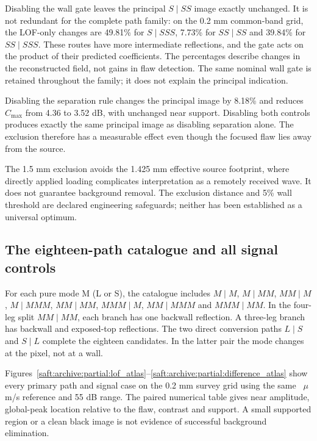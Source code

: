 \documentclass[11pt]{article}
\begin{document}
Disabling the wall gate leaves the principal $S\mid SS$ image exactly unchanged. It is not redundant for the complete path family: on the 0.2 mm common-band grid, the LOF-only changes are 49.81\% for $S\mid SSS$, 7.73\% for $SS\mid SS$ and 39.84\% for $SS\mid SSS$. These routes have more intermediate reflections, and the gate acts on the product of their predicted coefficients. The percentages describe changes in the reconstructed field, not gains in flaw detection. The same nominal wall gate is retained throughout the family; it does not explain the principal indication.

Disabling the separation rule changes the principal image by 8.18\% and reduces $C_{\max}$ from 4.36 to 3.52 dB, with unchanged near support. Disabling both controls produces exactly the same principal image as disabling separation alone. The exclusion therefore has a measurable effect even though the focused flaw lies away from the source.

The 1.5 mm exclusion avoids the 1.425 mm effective source footprint, where directly applied loading complicates interpretation as a remotely received wave. It does not guarantee background removal. The exclusion distance and 5\% wall threshold are declared engineering safeguards; neither has been established as a universal optimum.

\subsection{The eighteen-path catalogue and all signal controls}\label{saft:archive:partial:catalogue}
For each pure mode M (L or S), the catalogue includes $M\mid M$, $M\mid MM$, $MM\mid M$, $M\mid MMM$, $MM\mid MM$, $MMM\mid M$, $MM\mid MMM$ and $MMM\mid MM$. In the four-leg split $MM\mid MM$, each branch has one backwall reflection. A three-leg branch has backwall and exposed-top reflections. The two direct conversion paths $L\mid S$ and $S\mid L$ complete the eighteen candidates. In the latter pair the mode changes at the pixel, not at a wall.

Figures~\ref{saft:archive:partial:lof_atlas}--\ref{saft:archive:partial:difference_atlas} show every primary path and signal case on the 0.2 mm survey grid using the same \saftPartialDisplayReference\ $\mu$m/s reference and 55 dB range. The paired numerical table gives near amplitude, global-peak location relative to the flaw, contrast and support. A small supported region or a clean black image is not evidence of successful background elimination.
\end{document}
